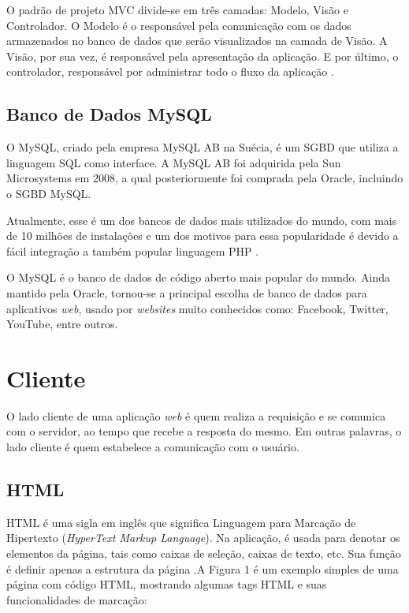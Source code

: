 \documentclass[
	12pt,				%
    oneside,			%
	a4paper,			%
	english,			%
	french,				%
	spanish,			%
	brazil,				%
	]{abntex2}
\begin{document}
O padrão de projeto MVC divide-se em três camadas: Modelo, Visão e
Controlador. O Modelo é o responsável pela comunicação com os dados
armazenados no banco de dados que serão visualizados na camada de Visão. A
Visão, por sua vez, é responsável pela apresentação da aplicação. E por último, o
controlador, responsável por administrar todo o fluxo da aplicação \cite{lemos}.


\subsection{Banco de Dados MySQL}
O MySQL, criado pela empresa MySQL AB na Suécia, é um SGBD que utiliza a
linguagem SQL como interface. A MySQL AB foi adquirida pela Sun Microsystems em
2008, a qual posteriormente foi comprada pela Oracle, incluindo o SGBD MySQL.

Atualmente, esse é um dos bancos de dados mais utilizados do mundo, com mais de
10 milhões de instalações e um dos motivos para essa popularidade é devido a fácil
integração a também popular linguagem PHP \cite{mottin}.

O MySQL é o banco de dados de código aberto mais popular do mundo. Ainda
mantido pela Oracle, tornou-se a principal escolha de banco de dados para aplicativos
\textit{web}, usado por \textit{websites} muito conhecidos como: Facebook, Twitter, YouTube, entre
outros.

\section{Cliente}

O lado cliente de uma aplicação \textit{web} é quem realiza a requisição e se comunica
com o servidor, ao tempo que recebe a resposta do mesmo. Em outras palavras, o
lado cliente é quem estabelece a comunicação com o usuário.

\subsection{HTML}

HTML é uma sigla em inglês que significa Linguagem para Marcação de
Hipertexto (\textit{HyperText Markup Language}). Na aplicação, é usada para denotar os 
elementos da página, tais como caixas de seleção, caixas de texto, etc. Sua função é
definir apenas a estrutura da página \cite{folle}.A Figura 1 é um exemplo simples de uma página com código HTML, mostrando
algumas tags HTML e suas funcionalidades de marcação:
\end{document}
